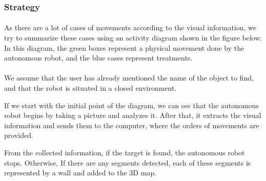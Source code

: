 \documentclass[12pt]{report}
\begin{document}
\subsubsection{Strategy}
\paragraph{}
As there are a lot of cases of movements according to the visual information, we try to summarize these cases using an activity diagram shown in the figure below. In this diagram, the green boxes represent a physical movement done by the autonomous robot, and the blue cases represent treatments. 

\paragraph{}
We assume that the user has already mentioned the name of the object to find, and that the robot is situated in a closed environment.

If we start with the initial point of the diagram, we can see that the autonomous robot begins by taking a picture and analyzes it. After that, it extracts the visual information and sends them to the computer, where the orders of movements are provided. 

From the collected information, if the target is found, the autonomous robot stops. Otherwise, If there are any segments detected, each of these segments is represented by a wall and added to the 3D map.
\end{document}
